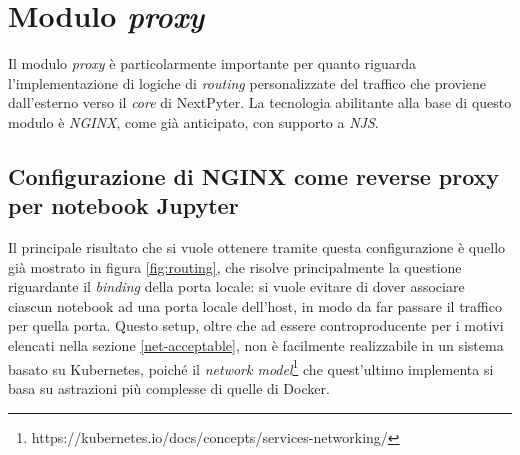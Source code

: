 \section{Modulo \textit{proxy}}
Il modulo \textit{proxy} è particolarmente importante per quanto riguarda l'implementazione di logiche di \textit{routing} personalizzate del traffico che proviene dall'esterno verso il \textit{core} di NextPyter. 
\newline
La tecnologia abilitante alla base di questo modulo è \textit{NGINX}, come già anticipato, con supporto a \textit{NJS}.
\subsection{Configurazione di NGINX come reverse proxy per notebook Jupyter}
Il principale risultato che si vuole ottenere tramite questa configurazione è quello già mostrato in figura \ref{fig:routing}, che risolve principalmente la questione riguardante il \textit{binding} della porta locale: si vuole evitare di dover associare ciascun notebook ad una porta locale dell'host, in modo da far passare il traffico per quella porta. Questo setup, oltre che ad essere controproducente per i motivi elencati nella sezione \ref{net-acceptable}, non è facilmente realizzabile in un sistema basato su Kubernetes, poiché il \textit{network model}\footnote{https://kubernetes.io/docs/concepts/services-networking/} che quest'ultimo implementa si basa su astrazioni più complesse di quelle di Docker.
\newline

